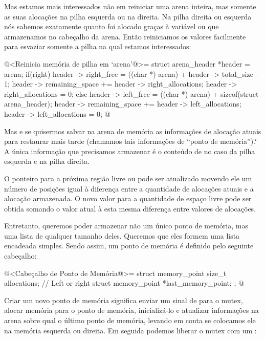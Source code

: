 Mas estamos mais interessados não em reiniciar uma arena inteira, mas
somente as suas alocações na pilha esquerda ou na direita. Na pilha
direita ou esquerda nós sabemos exatamente quanto foi alocado graças à
variável 
ou  que armazenamos no cabeçalho da
arena. Então reiniciamos os valores facilmente para esvaziar somente a
pilha na qual estamos interessados:

\iniciocodigo
@<Reinicia memória de pilha em `arena'@>=
{
  struct arena_header *header = arena;
  if(right){
    header -> right_free = ((char *) arena) + header -> total_size - 1;
    header -> remaining_space += header -> right_allocations;
    header -> right_allocations = 0;
  }
  else{
    header -> left_free = ((char *) arena) + sizeof(struct arena_header);
    header -> remaining_space += header -> left_allocations;
    header -> left_allocations = 0;
  }
}
@
\fimcodigo

Mas e se quisermos salvar na arena de memória as informações de
alocação atuais para restaurar mais tarde (chamamos tais informações
de ``ponto de memória'')? A única informação que precisamos armazenar
é o conteúdo de  no caso da pilha
esquerda e  na pilha direita.

O ponteiro para a próxima região livre 
ou  pode ser atualizado movendo ele um número
de posições igual à diferença entre a quantidade de alocações atuais e
a alocação armazenada. O novo valor para a quantidade de espaço livre
pode ser obtida somando o valor atual à esta mesma diferença entre
valores de alocações.

Entretanto, queremos poder armazenar não um único ponto de memória,
mas uma lista de qualquer tamanho deles. Queremos que eles formem uma
lista encadeada simples. Sendo assim, um ponto de memória é definido
pelo seguinte cabeçalho:

\iniciocodigo
@<Cabeçalho de Ponto de Memória@>=
struct memory_point{
  size_t allocations; // Left or right
  struct memory_point *last_memory_point;
};
@
\fimcodigo


Criar um novo ponto de memória significa enviar um sinal
de  para o mutex, alocar memória para o ponto de
memória, inicializá-lo e atualizar informações na arena sobre qual o
último ponto de memória, levando em conta se colocamos ele na memória
esquerda ou direita. Em seguida podemos liberar o mutex com
um :

